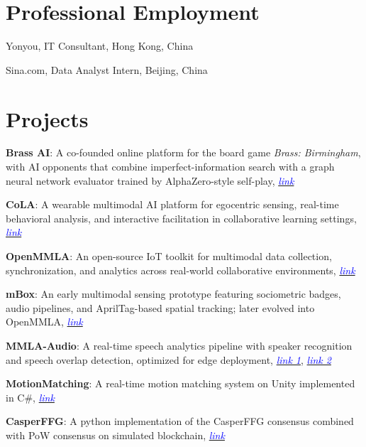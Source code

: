 \documentclass[11pt,letterpaper]{report}
\newcommand{\listitemspace}{0.25em}
\renewenvironment{itemize}
{\begin{list}{}{\setlength{\leftmargin}{0em}
                \setlength{\parskip}{0em}
                \setlength{\itemsep}{\listitemspace}
                \setlength{\parsep}{\listitemspace}}}
{\end{list}}
\begin{document}
    \section*{Professional Employment}

    \begin{tablist}
        \item[May 2019--Aug 2019] \tab{}Yonyou, IT Consultant, Hong Kong, China
        \item[Jun 2017--Aug 2017] \tab{}Sina.com, Data Analyst Intern, Beijing, China
    \end{tablist}

    \section*{Projects}

    \begin{itemize}
        \item \textbf{Brass AI}: A co-founded online platform for the board game \textit{Brass: Birmingham}, with AI opponents that combine imperfect-information search with a graph neural network evaluator trained by AlphaZero-style self-play, \href{https://brass.ucph-cola.org}{\textcolor{blue}{\textit{link}}}
        \item \textbf{CoLA}: A wearable multimodal AI platform for egocentric sensing, real-time behavioral analysis, and interactive facilitation in collaborative learning settings, \href{https://ucph-cola.org}{\textcolor{blue}{\textit{link}}}
        \item \textbf{OpenMMLA}: An open-source IoT toolkit for multimodal data collection, synchronization, and analytics across real-world collaborative environments, \href{https://github.com/ucph-ccs/OpenMMLA}{\textcolor{blue}{\textit{link}}}
        \item \textbf{mBox}: An early multimodal sensing prototype featuring sociometric badges, audio pipelines, and AprilTag-based spatial tracking; later evolved into OpenMMLA, \href{https://github.com/ucph-ccs/mbox-uber}{\textcolor{blue}{\textit{link}}}
        \item \textbf{MMLA-Audio}: A real-time speech analytics pipeline with speaker recognition and speech overlap detection, optimized for edge deployment, \href{https://github.com/lizaibeim/mmla-audio}{\textcolor{blue}{\textit{link 1}}}, \href{https://github.com/lizaibeim/mmla-tiny-audio}{\textcolor{blue}{\textit{link 2}}}
        \item \textbf{MotionMatching}: A real-time motion matching system on Unity implemented in C\#, \href{https://github.com/lizaibeim/motion-matching}{\textcolor{blue}{\textit{link}}}
        \item \textbf{CasperFFG}: A python implementation of the CasperFFG consensus combined with PoW consensus on simulated blockchain, \href{https://github.com/lizaibeim/casper-ffg}{\textcolor{blue}{\textit{link}}}
    \end{itemize}
\end{document}
